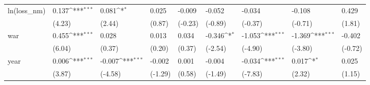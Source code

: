 \def\sym#1{\ifmmode^{#1}\else\(^{#1}\)\fi}
\begin{tabular}{p{1.5cm} p{2cm} p{1.7cm} p{1.7cm} p{1.7cm} p{1.7cm} p{1.7cm} p{1.7cm} p{1.7cm}}
\hline
ln(loss\_nm)     &    0.137\sym{***}&    0.081\sym{*}  &    0.025         &   -0.009         &   -0.052         &   -0.034         &   -0.108         &    0.429         \\
                &   (4.23)         &   (2.44)         &   (0.87)         &  (-0.23)         &  (-0.89)         &  (-0.37)         &  (-0.71)         &   (1.81)         \\
war             &    0.455\sym{***}&    0.028         &    0.013         &    0.034         &   -0.346\sym{*}  &   -1.053\sym{***}&   -1.369\sym{***}&   -0.402         \\
                &   (6.04)         &   (0.37)         &   (0.20)         &   (0.37)         &  (-2.54)         &  (-4.90)         &  (-3.80)         &  (-0.72)         \\
year            &    0.006\sym{***}&   -0.007\sym{***}&   -0.002         &    0.001         &   -0.004         &   -0.034\sym{***}&    0.017\sym{*}  &    0.025         \\
                &   (3.87)         &  (-4.58)         &  (-1.29)         &   (0.58)         &  (-1.49)         &  (-7.83)         &   (2.32)         &   (1.15)         \\
\end{tabular}
